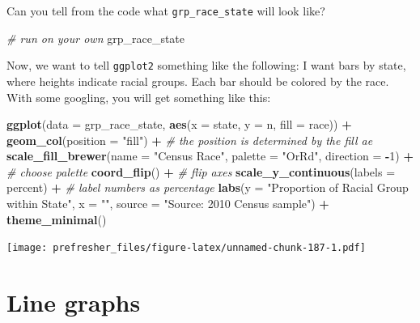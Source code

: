 \documentclass[]{book}
\newenvironment{Shaded}{\begin{snugshade}}{\end{snugshade}}
\newcommand{\KeywordTok}[1]{\textcolor[rgb]{0.13,0.29,0.53}{\textbf{#1}}}
\newcommand{\DataTypeTok}[1]{\textcolor[rgb]{0.13,0.29,0.53}{#1}}
\newcommand{\DecValTok}[1]{\textcolor[rgb]{0.00,0.00,0.81}{#1}}
\newcommand{\StringTok}[1]{\textcolor[rgb]{0.31,0.60,0.02}{#1}}
\newcommand{\CommentTok}[1]{\textcolor[rgb]{0.56,0.35,0.01}{\textit{#1}}}
\newcommand{\OperatorTok}[1]{\textcolor[rgb]{0.81,0.36,0.00}{\textbf{#1}}}
\newcommand{\NormalTok}[1]{#1}
\theoremstyle{definition}
\theoremstyle{definition}
\theoremstyle{definition}
\theoremstyle{remark}
\begin{document}
Can you tell from the code what \texttt{grp\_race\_state} will look
like?

\begin{Shaded}
\begin{Highlighting}[]
\CommentTok{# run on your own}
\NormalTok{grp_race_state}
\end{Highlighting}
\end{Shaded}

Now, we want to tell \texttt{ggplot2} something like the following: I
want bars by state, where heights indicate racial groups. Each bar
should be colored by the race. With some googling, you will get
something like this:

\begin{Shaded}
\begin{Highlighting}[]
\KeywordTok{ggplot}\NormalTok{(}\DataTypeTok{data =}\NormalTok{ grp_race_state, }\KeywordTok{aes}\NormalTok{(}\DataTypeTok{x =}\NormalTok{  state, }\DataTypeTok{y =}\NormalTok{ n,  }\DataTypeTok{fill =}\NormalTok{ race)) }\OperatorTok{+}
\StringTok{  }\KeywordTok{geom_col}\NormalTok{(}\DataTypeTok{position =} \StringTok{"fill"}\NormalTok{) }\OperatorTok{+}\StringTok{ }\CommentTok{# the position is determined by the fill ae}
\StringTok{  }\KeywordTok{scale_fill_brewer}\NormalTok{(}\DataTypeTok{name =} \StringTok{"Census Race"}\NormalTok{, }\DataTypeTok{palette =} \StringTok{"OrRd"}\NormalTok{, }\DataTypeTok{direction =} \OperatorTok{-}\DecValTok{1}\NormalTok{) }\OperatorTok{+}\StringTok{ }\CommentTok{# choose palette}
\StringTok{  }\KeywordTok{coord_flip}\NormalTok{() }\OperatorTok{+}\StringTok{ }\CommentTok{# flip axes}
\StringTok{  }\KeywordTok{scale_y_continuous}\NormalTok{(}\DataTypeTok{labels =}\NormalTok{ percent) }\OperatorTok{+}\StringTok{ }\CommentTok{# label numbers as percentage}
\StringTok{  }\KeywordTok{labs}\NormalTok{(}\DataTypeTok{y =} \StringTok{"Proportion of Racial Group within State"}\NormalTok{,}
       \DataTypeTok{x =} \StringTok{""}\NormalTok{,}
       \DataTypeTok{source =} \StringTok{"Source: 2010 Census  sample"}\NormalTok{) }\OperatorTok{+}
\StringTok{  }\KeywordTok{theme_minimal}\NormalTok{()}
\end{Highlighting}
\end{Shaded}

\texttt{[image: prefresher\_files/figure-latex/unnamed-chunk-187-1.pdf]}

\section{Line graphs}\label{line-graphs}
\end{document}
